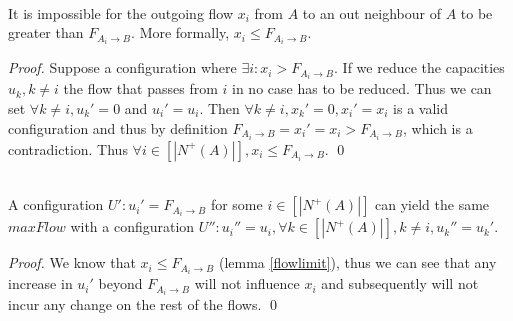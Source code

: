 \documentclass[11pt]{llncs}
\begin{document}

    \begin{lemma} \ \\
       \label{flowlimit}
       It is impossible for the outgoing flow $x_i$ from $A$ to an out neighbour of $A$ to be greater than
       $F_{A_i \rightarrow B}$. More formally, $x_i \leq F_{A_i \rightarrow B}$.
    \end{lemma}
    \begin{proof}
       Suppose a configuration where $\exists i : x_i > F_{A_i \rightarrow B}$. If we reduce the capacities $u_k, k \neq i$
       the flow that passes from $i$ in no case has to be reduced. Thus we can set $\forall k \neq i, u_k' = 0$ and $u_i' =
       u_i$. Then $\forall k \neq i,x_k' = 0, x_i' = x_i$ is a valid configuration and thus by definition $F_{A_i \rightarrow
       B} = x_i' = x_i > F_{A_i \rightarrow B}$, which is a contradiction. Thus $\forall i \in [|N^{+}(A)|], x_i \leq
       F_{A_i \rightarrow B}$. \qed
    \end{proof}

    \begin{theorem} \ \\
       \label{trustsave}
       A configuration $U' : u_i' = F_{A_i \rightarrow B}$ for some $i \in [|N^{+}(A)|]$ can yield the same $maxFlow$ with a
       configuration $U'' : u_i'' = u_i, \forall k \in [|N^{+}(A)|], k \neq i, u_k'' = u_k'$.
    \end{theorem}
    \begin{proof}
       We know that $x_i \leq F_{A_i \rightarrow B}$ (lemma \ref{flowlimit}), thus we can see that any increase in $u_i'$
       beyond $F_{A_i \rightarrow B}$ will not influence $x_i$ and subsequently will not incur any change on the rest of the
       flows. \qed
    \end{proof}
\end{document}
